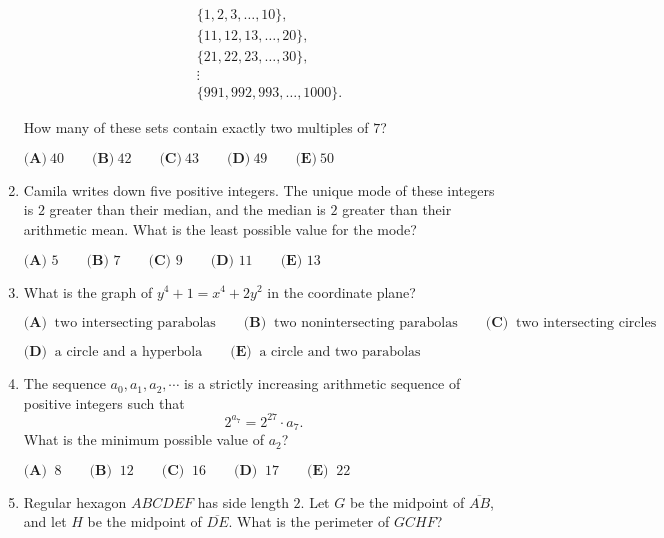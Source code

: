 \documentclass{article}
\begin{document}
\begin{enumerate}[label=\arabic*., itemsep=0.5em]
\begin{align*}
&\{1,2,3,\ldots,10\}, \\
&\{11,12,13,\ldots,20\},\\
&\{21,22,23,\ldots,30\},\\
&\vdots\\
&\{991,992,993,\ldots,1000\}.
\end{align*}

How many of these sets contain exactly two multiples of $7$?

$\textbf{(A)}\ 40\qquad\textbf{(B)}\ 42\qquad\textbf{(C)}\ 43\qquad\textbf{(D)}\ 49\qquad\textbf{(E)}\ 50$\par \vspace{0.5em}\item Camila writes down five positive integers. The unique mode of these integers is $2$ greater than their median, and the median is $2$ greater than their arithmetic mean. What is the least possible value for the mode?

$\textbf{(A) }5\qquad\textbf{(B) }7\qquad\textbf{(C) }9\qquad\textbf{(D) }11\qquad\textbf{(E) }13$\par \vspace{0.5em}\item What is the graph of $y^4+1=x^4+2y^2$ in the coordinate plane?

$\textbf{(A) }\ \text{two intersecting parabolas} \qquad \textbf{(B) }\ \text{two nonintersecting parabolas} \qquad \textbf{(C) }\ \text{two intersecting circles} \qquad$

$\textbf{(D) }\ \text{a circle and a hyperbola} \qquad \textbf{(E) }\ \text{a circle and two parabolas}$\par \vspace{0.5em}\item The sequence $a_0,a_1,a_2,\cdots$ is a strictly increasing arithmetic sequence of positive integers such that 
\begin{equation*}
2^{a_7}=2^{27} \cdot a_7.
\end{equation*}
 What is the minimum possible value of $a_2$?

$\textbf{(A) }\ 8 \qquad \textbf{(B) }\ 12 \qquad \textbf{(C) }\ 16 \qquad \textbf{(D) }\ 17 \qquad \textbf{(E) }\ 22$\par \vspace{0.5em}\item Regular hexagon $ABCDEF$ has side length $2$. Let $G$ be the midpoint of $\overline{AB}$, and let $H$ be the midpoint of $\overline{DE}$. What is the perimeter of $GCHF$?


\end{enumerate}
\end{document}
